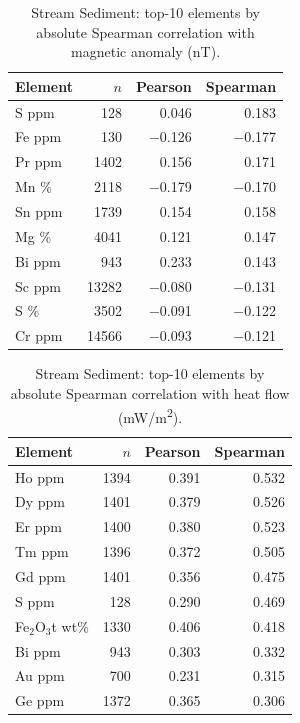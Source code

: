 
\begin{table}[H]
  \centering
  \caption{Stream Sediment: top-10 elements by absolute Spearman correlation with magnetic anomaly (nT).}
  \label{tab:ss-magnetic}
  \begin{tabular}{lrrr}
    \toprule
    Element & $n$ & Pearson & Spearman \\
    \midrule
    S ppm   & 128   & 0.046    & 0.183 \\
    Fe ppm  & 130   & $-$0.126 & $-$0.177 \\
    Pr ppm  & 1402  & 0.156    & 0.171 \\
    Mn \%   & 2118  & $-$0.179 & $-$0.170 \\
    Sn ppm  & 1739  & 0.154    & 0.158 \\
    Mg \%   & 4041  & 0.121    & 0.147 \\
    Bi ppm  & 943   & 0.233    & 0.143 \\
    Sc ppm  & 13282 & $-$0.080 & $-$0.131 \\
    S \%    & 3502  & $-$0.091 & $-$0.122 \\
    Cr ppm  & 14566 & $-$0.093 & $-$0.121 \\
    \bottomrule
  \end{tabular}
\end{table}

\begin{table}[H]
  \centering
  \caption{Stream Sediment: top-10 elements by absolute Spearman correlation with heat flow (mW/m\textsuperscript{2}).}
  \label{tab:ss-heatflow}
  \begin{tabular}{lrrr}
    \toprule
    Element & $n$ & Pearson & Spearman \\
    \midrule
    Ho ppm      & 1394 & 0.391 & 0.532 \\
    Dy ppm      & 1401 & 0.379 & 0.526 \\
    Er ppm      & 1400 & 0.380 & 0.523 \\
    Tm ppm      & 1396 & 0.372 & 0.505 \\
    Gd ppm      & 1401 & 0.356 & 0.475 \\
    S ppm       & 128  & 0.290 & 0.469 \\
    Fe$_2$O$_3$t wt\% & 1330 & 0.406 & 0.418 \\
    Bi ppm      & 943  & 0.303 & 0.332 \\
    Au ppm      & 700  & 0.231 & 0.315 \\
    Ge ppm      & 1372 & 0.365 & 0.306 \\
    \bottomrule
  \end{tabular}
\end{table}

